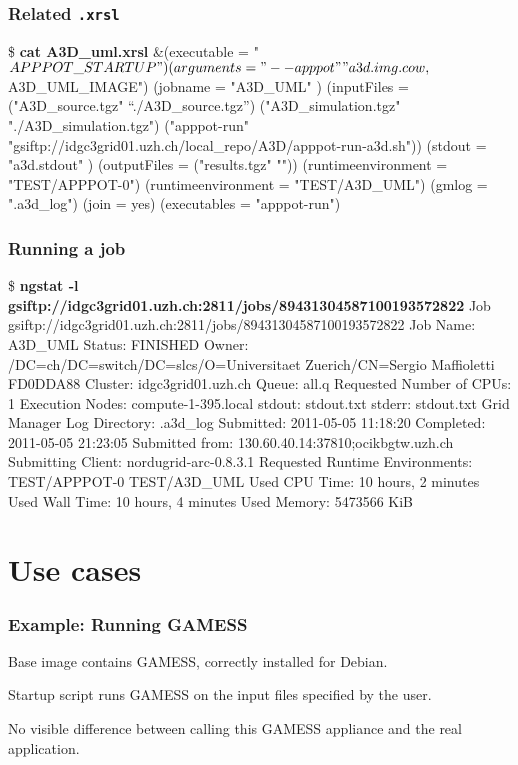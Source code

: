 \documentclass{beamer}
\begin{document}
\begin{frame}[fragile]
  \frametitle{Related \texttt{.xrsl}}
\begin{semiverbatim}\small
\$ \textbf{cat A3D\_uml.xrsl}
&(executable = "$APPPOT\_STARTUP" )
(arguments = "--apppot" "a3d.img.cow,$A3D\_UML\_IMAGE")
(jobname = "A3D\_UML" )
(inputFiles = 
  ("A3D\_source.tgz" “./A3D\_source.tgz”) 
  ("A3D\_simulation.tgz" "./A3D\_simulation.tgz") 
  ("apppot-run" 
   "gsiftp://idgc3grid01.uzh.ch/local\_repo/A3D/apppot-run-a3d.sh"))
(stdout = "a3d.stdout" )
(outputFiles = ("results.tgz" ""))
(runtimeenvironment = "TEST/APPPOT-0")
(runtimeenvironment = "TEST/A3D\_UML")
(gmlog = ".a3d\_log")
(join = yes)
(executables = "apppot-run")
\end{semiverbatim}
\end{frame}

\begin{frame}[fragile]
  \frametitle{Running a job}
\begin{semiverbatim}\tiny
\$ \textbf{ngstat -l gsiftp://idgc3grid01.uzh.ch:2811/jobs/89431304587100193572822}
Job gsiftp://idgc3grid01.uzh.ch:2811/jobs/89431304587100193572822
  Job Name: A3D\_UML
  Status: FINISHED
  Owner: /DC=ch/DC=switch/DC=slcs/O=Universitaet Zuerich/CN=Sergio Maffioletti FD0DDA88
  Cluster: idgc3grid01.uzh.ch
  Queue: all.q
  Requested Number of CPUs: 1
  Execution Nodes:
    compute-1-395.local
  stdout: stdout.txt
  stderr: stdout.txt
  Grid Manager Log Directory: .a3d\_log
  Submitted: 2011-05-05 11:18:20
  Completed: 2011-05-05 21:23:05
  Submitted from: 130.60.40.14:37810;ocikbgtw.uzh.ch
  Submitting Client: nordugrid-arc-0.8.3.1
  Requested Runtime Environments:
    TEST/APPPOT-0
    TEST/A3D\_UML
  Used CPU Time: 10 hours, 2 minutes
  Used Wall Time: 10 hours, 4 minutes
  Used Memory: 5473566 KiB
\end{semiverbatim}
\end{frame}


\section{Use cases}

\begin{frame}
  \frametitle{Example: Running GAMESS}
  \label{sec:18}
  Base image contains GAMESS, correctly installed for Debian.

  \+
  Startup script runs GAMESS on the input files specified by the user.
  
  \+
  No visible difference between calling this GAMESS appliance and the
  real application.
\end{frame}
\end{document}

